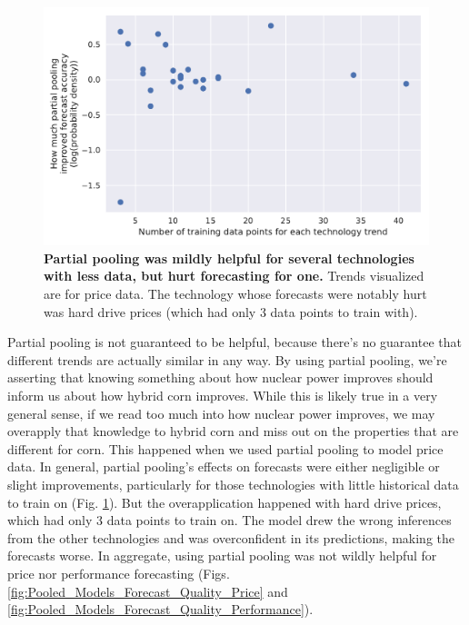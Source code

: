 \documentclass{article}
\begin{document}
\begin{figure}
    \centering
    \includegraphics[width=.75\textwidth]{figs/Separate_vs_Pooled_Forecast_Accuracy_Price.pdf}
    \caption{\textbf{Partial pooling was mildly helpful for several technologies with less data, but hurt forecasting for one.} Trends visualized are for price data. The technology whose forecasts were notably hurt was hard drive prices (which had only 3 data points to train with).}
    \label{Separate_vs_Pooled_Forecast_Accuracy_Price}
\end{figure}

Partial pooling is not guaranteed to be helpful, because there's no guarantee that different trends are actually similar in any way. By using partial pooling, we're asserting that knowing something about how nuclear power improves should inform us about how hybrid corn improves. While this is likely true in a very general sense, if we read too much into how nuclear power improves, we may overapply that knowledge to hybrid corn and miss out on the properties that are different for corn. This happened when we used partial pooling to model price data. In general, partial pooling's effects on forecasts were either negligible or slight improvements, particularly for those technologies with little historical data to train on (Fig. \ref{Separate_vs_Pooled_Forecast_Accuracy_Price}). But the overapplication happened with hard drive prices, which had only 3 data points to train on. The model drew the wrong inferences from the other technologies and was overconfident in its predictions, making the forecasts worse. In aggregate, using partial pooling was not wildly helpful for price nor performance forecasting (Figs. \ref{fig:Pooled_Models_Forecast_Quality_Price} and \ref{fig:Pooled_Models_Forecast_Quality_Performance}).
\end{document}
